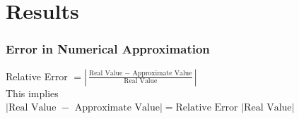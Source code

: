 
\section{Results}

	\begin{frame}%
		\frametitle{Error in Numerical Approximation}
		
		Relative Error $= |\frac{\text{Real Value } -\text{ Approximate Value}}{\text{Real Value}}|$\\\vspace{5mm}
		This implies \\\vspace{5mm}
		$|\text{Real Value } - \text{ Approximate Value}|=\text{Relative Error }  |\text{Real Value}|$
	
	\end{frame}



